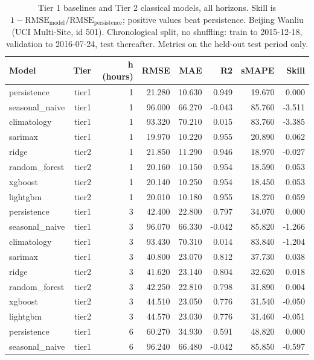 \begin{table}[htbp]
\caption{Tier 1 baselines and Tier 2 classical models, all horizons. Skill is $1 - \mathrm{RMSE}_{\mathrm{model}}/\mathrm{RMSE}_{\mathrm{persistence}}$; positive values beat persistence. Beijing Wanliu (UCI Multi-Site, id 501). Chronological split, no shuffling: train to 2015-12-18, validation to 2016-07-24, test thereafter. Metrics on the held-out test period only.}
\label{tab:tier1_tier2_all_horizons}
\begin{tabular}{lrrrrrrr}
\toprule
Model & Tier & h (hours) & RMSE & MAE & R2 & sMAPE & Skill \\
\midrule
persistence & tier1 & 1 & 21.280 & 10.630 & 0.949 & 19.670 & 0.000 \\
seasonal\_naive & tier1 & 1 & 96.000 & 66.270 & -0.043 & 85.760 & -3.511 \\
climatology & tier1 & 1 & 93.320 & 70.210 & 0.015 & 83.760 & -3.385 \\
sarimax & tier1 & 1 & 19.970 & 10.220 & 0.955 & 20.890 & 0.062 \\
ridge & tier2 & 1 & 21.850 & 11.290 & 0.946 & 18.970 & -0.027 \\
random\_forest & tier2 & 1 & 20.160 & 10.150 & 0.954 & 18.590 & 0.053 \\
xgboost & tier2 & 1 & 20.140 & 10.250 & 0.954 & 18.450 & 0.053 \\
lightgbm & tier2 & 1 & 20.010 & 10.180 & 0.955 & 18.270 & 0.059 \\
persistence & tier1 & 3 & 42.400 & 22.800 & 0.797 & 34.070 & 0.000 \\
seasonal\_naive & tier1 & 3 & 96.070 & 66.330 & -0.042 & 85.820 & -1.266 \\
climatology & tier1 & 3 & 93.430 & 70.310 & 0.014 & 83.840 & -1.204 \\
sarimax & tier1 & 3 & 40.800 & 23.070 & 0.812 & 37.730 & 0.038 \\
ridge & tier2 & 3 & 41.620 & 23.140 & 0.804 & 32.620 & 0.018 \\
random\_forest & tier2 & 3 & 42.250 & 22.810 & 0.798 & 31.890 & 0.004 \\
xgboost & tier2 & 3 & 44.510 & 23.050 & 0.776 & 31.540 & -0.050 \\
lightgbm & tier2 & 3 & 44.570 & 23.030 & 0.776 & 31.460 & -0.051 \\
persistence & tier1 & 6 & 60.270 & 34.930 & 0.591 & 48.820 & 0.000 \\
seasonal\_naive & tier1 & 6 & 96.240 & 66.480 & -0.042 & 85.850 & -0.597 \\

\end{tabular}
\end{table}

